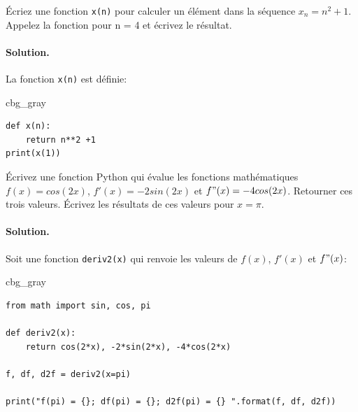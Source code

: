 \documentclass[%
oneside,                 %
final,                   %
10pt,french]{article}
\newenvironment{_cod_tight}[1]{
   \def\FrameCommand{\colorbox{#1}}
   \FrameRule0.6pt\MakeFramed {\FrameRestore}\vskip3mm}
   {\vskip0mm\endMakeFramed}
\newenvironment{cod}[1]{
\bgroup\rmfamily
\fboxsep=0mm\relax
\begin{_cod_tight}{#1}
\list{}{\parsep=-2mm\parskip=0mm\topsep=0pt\leftmargin=2mm
\rightmargin=2\leftmargin\leftmargin=4pt\relax}
\item\relax}
{\endlist\end{_cod_tight}\egroup}
\newenvironment{doconceexercise}{}{}
\newcounter{doconceexercisecounter}
\begin{document}


\begin{doconceexercise}



Écriez une fonction \texttt{x(n)} pour calculer un élément dans la séquence $x_n = n^2 + 1 $. Appelez la fonction pour n = 4 et écrivez le résultat.


\paragraph{Solution.}
La fonction \texttt{x(n)} est définie:
\begin{cod}{cbg_gray}\begin{verbatim}
def x(n):
    return n**2 +1
print(x(1))
\end{verbatim}
\end{cod}
\noindent


\end{doconceexercise}




\begin{doconceexercise}



Écrivez une fonction Python qui évalue les fonctions mathématiques $f(x) = cos(2x)$, $f'(x) = -2sin(2x)$ et $f"(x) = - 4 cos(2x)$. Retourner ces trois valeurs. Écrivez les résultats de ces valeurs pour $x = \pi$.


\paragraph{Solution.}
Soit une fonction \texttt{deriv2(x)} qui renvoie les valeurs de $f(x)$, $f'(x)$ et $f"(x)$:
\begin{cod}{cbg_gray}\begin{verbatim}
from math import sin, cos, pi

def deriv2(x):
    return cos(2*x), -2*sin(2*x), -4*cos(2*x)

f, df, d2f = deriv2(x=pi)

print("f(pi) = {}; df(pi) = {}; d2f(pi) = {} ".format(f, df, d2f))
\end{verbatim}
\end{cod}
\noindent


\end{doconceexercise}



\end{document}
